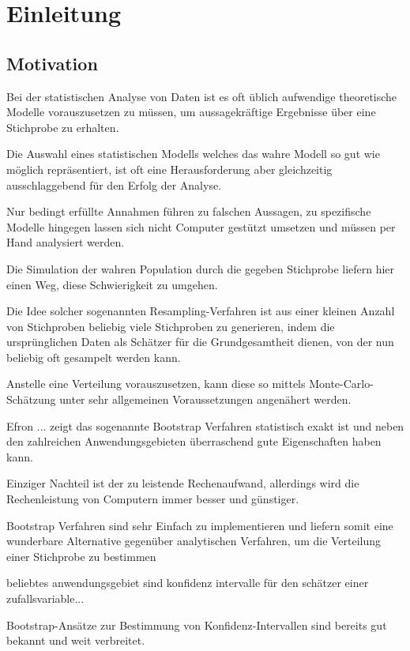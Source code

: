 \chapter{Einleitung}

\section{Motivation}
Bei der statistischen Analyse von Daten ist es oft üblich aufwendige theoretische Modelle vorauszusetzen zu müssen, um aussagekräftige Ergebnisse über eine Stichprobe zu erhalten.

Die Auswahl eines statistischen Modells welches das wahre Modell so gut wie möglich repräsentiert, ist oft eine Herausforderung aber gleichzeitig ausschlaggebend für den Erfolg der Analyse.

Nur bedingt erfüllte Annahmen führen zu falschen Aussagen, zu spezifische Modelle hingegen lassen sich nicht Computer gestützt umsetzen und müssen per Hand analysiert werden.

Die Simulation der wahren Population durch die gegeben Stichprobe liefern hier einen Weg, diese Schwierigkeit zu umgehen.

Die Idee solcher sogenannten Resampling-Verfahren ist aus einer kleinen Anzahl von Stichproben beliebig viele Stichproben zu generieren, indem die ursprünglichen Daten als Schätzer für die Grundgesamtheit dienen, von der nun beliebig oft gesampelt werden kann.

Anstelle eine Verteilung vorauszusetzen, kann diese so mittels Monte-Carlo-Schätzung unter sehr allgemeinen Voraussetzungen angenähert werden.

Efron ... zeigt das sogenannte Bootstrap Verfahren statistisch exakt ist und neben den zahlreichen Anwendungsgebieten überraschend gute Eigenschaften haben kann.

Einziger Nachteil ist der zu leistende Rechenaufwand, allerdings wird die Rechenleistung von Computern immer besser und günstiger.

Bootstrap Verfahren sind sehr Einfach zu implementieren und liefern somit eine wunderbare Alternative gegenüber analytischen Verfahren, um die Verteilung einer Stichprobe zu bestimmen

beliebtes anwendungsgebiet sind konfidenz intervalle für den schätzer einer zufallsvariable...

Bootstrap-Ansätze zur Bestimmung von Konfidenz-Intervallen sind bereits gut bekannt und weit verbreitet. 

